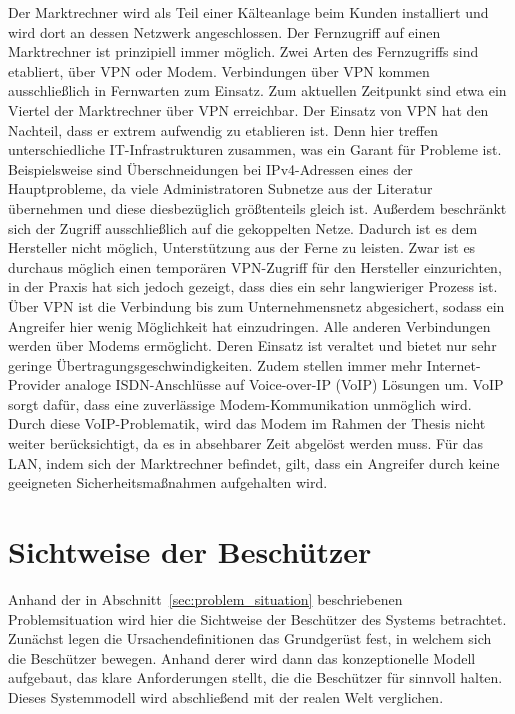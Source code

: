 \documentclass[11pt,a4paper]{report}
\begin{document}
Der Marktrechner wird als Teil einer Kälteanlage beim Kunden installiert und wird dort an dessen Netzwerk angeschlossen. Der Fernzugriff auf einen Marktrechner ist prinzipiell immer möglich. Zwei Arten des Fernzugriffs sind etabliert, über VPN oder Modem. Verbindungen über VPN kommen ausschließlich in Fernwarten zum Einsatz. Zum aktuellen Zeitpunkt sind etwa ein Viertel der Marktrechner über VPN erreichbar. Der Einsatz von VPN hat den Nachteil, dass er extrem aufwendig zu etablieren ist. Denn hier treffen unterschiedliche IT-Infrastrukturen zusammen, was ein Garant für Probleme ist. Beispielsweise sind Überschneidungen bei IPv4-Adressen eines der Hauptprobleme, da viele Administratoren Subnetze aus der Literatur übernehmen und diese diesbezüglich größtenteils gleich ist. Außerdem beschränkt sich der Zugriff ausschließlich auf die gekoppelten Netze. Dadurch ist es dem Hersteller nicht möglich, Unterstützung aus der Ferne zu leisten. Zwar ist es durchaus möglich einen temporären VPN-Zugriff für den Hersteller einzurichten, in der Praxis hat sich jedoch gezeigt, dass dies ein sehr langwieriger Prozess ist. Über VPN ist die Verbindung bis zum Unternehmensnetz abgesichert, sodass ein Angreifer hier wenig Möglichkeit hat einzudringen. Alle anderen Verbindungen werden über Modems ermöglicht. Deren Einsatz ist veraltet und bietet nur sehr geringe Übertragungsgeschwindigkeiten. Zudem stellen immer mehr Internet-Provider analoge ISDN-Anschlüsse auf Voice-over-IP (VoIP) Lösungen um. VoIP sorgt dafür, dass eine zuverlässige Modem-Kommunikation unmöglich wird. Durch diese VoIP-Problematik, wird das Modem im Rahmen der Thesis nicht weiter berücksichtigt, da es in absehbarer Zeit abgelöst werden muss. Für das LAN, indem sich der Marktrechner befindet, gilt, dass ein Angreifer durch keine geeigneten Sicherheitsmaßnahmen aufgehalten wird.

\section{Sichtweise der Beschützer} 

Anhand der in Abschnitt~\ref{sec:problem_situation} beschriebenen Problemsituation wird hier die Sichtweise der Beschützer des Systems betrachtet. Zunächst legen die Ursachendefinitionen das Grundgerüst fest, in welchem sich die Beschützer bewegen. Anhand derer wird dann das konzeptionelle Modell aufgebaut, das klare Anforderungen stellt, die die Beschützer für sinnvoll halten. Dieses Systemmodell wird abschließend mit der realen Welt verglichen.
\end{document}
